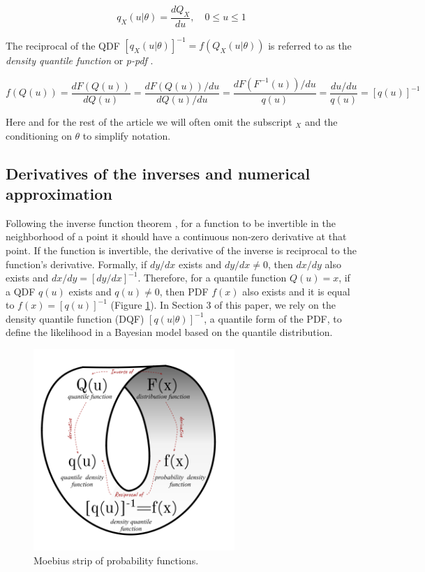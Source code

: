 \documentclass[
  12pt,
]{article}
\begin{document}
\[
q_X(u|\theta)=\frac{dQ_X}{du}, \quad 0 \leq u \leq 1
\]

The reciprocal of the QDF \([q_X(u|\theta)]^{-1}=f(Q_X(u|\theta))\) is referred to as the \emph{density quantile function} \citep{parzen1980DataModelingUsing} or \emph{p-pdf} \citep{gilchrist2000StatisticalModellingQuantile}.

\[
f(Q(u))=\frac{dF(Q(u))}{dQ(u)} = \frac{dF(Q(u))/du}{dQ(u)/du}=\frac{dF(F^{-1}(u))/du}{q(u)}=\frac{du/du}{q(u)}=[q(u)]^{-1}
\]

Here and for the rest of the article we will often omit the subscript \(_X\) and the conditioning on \(\theta\) to simplify notation.

\hypertarget{derivatives-of-the-inverses-and-numerical-approximation}{%
\subsection{Derivatives of the inverses and numerical approximation}\label{derivatives-of-the-inverses-and-numerical-approximation}}

Following the inverse function theorem \citep{price1984InverseFunctionTheorem}, for a function to be invertible in the neighborhood of a point it should have a continuous non-zero derivative at that point. If the function is invertible, the derivative of the inverse is reciprocal to the function's derivative. Formally, if \(dy/dx\) exists and \(dy/dx \neq 0\), then \(dx/dy\) also exists and \(dx/dy=[dy/dx]^{-1}\). Therefore, for a quantile function \(Q(u)=x\), if a QDF \(q(u)\) exists and \(q(u)\neq0\), then PDF \(f(x)\) also exists and it is equal to \(f(x)=[q(u)]^{-1}\) (Figure \ref{fig:moebius-chart}). In Section 3 of this paper, we rely on the density quantile function (DQF) \([q(u|\theta)]^{-1}\), a quantile form of the PDF, to define the likelihood in a Bayesian model based on the quantile distribution.

\begin{figure}

{\centering \includegraphics[width=3in]{img/moebius-loop} 

}

\caption{Moebius strip of probability functions.}\label{fig:moebius-chart}
\end{figure}
\end{document}
